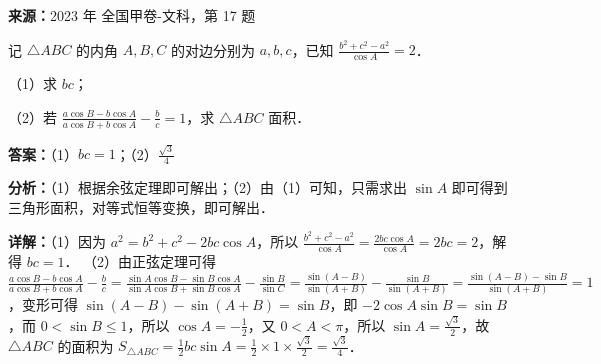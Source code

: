 \begin{question}
\textbf{来源：}2023 年 全国甲卷-文科，第 17 题\par
记 $\triangle ABC$ 的内角 $A,B,C$ 的对边分别为 $a,b,c$，已知 $\frac{b^2+c^2-a^2}{\cos A}=2$．

（1）求 $bc$；

（2）若 $\frac{a\cos B-b\cos A}{a\cos B+b\cos A}-\frac{b}{c}=1$，求 $\triangle ABC$ 面积．
\begin{solution}
\textbf{答案：}（1）$bc=1$；（2）$\frac{\sqrt{3}}{4}$

\textbf{分析：}（1）根据余弦定理即可解出；（2）由（1）可知，只需求出 $\sin A$ 即可得到三角形面积，对等式恒等变换，即可解出．

\textbf{详解：}（1）因为 $a^2=b^2+c^2-2bc\cos A$，所以 $\frac{b^2+c^2-a^2}{\cos A}=\frac{2bc\cos A}{\cos A}=2bc=2$，解得 $bc=1$．
（2）由正弦定理可得 $\frac{a\cos B-b\cos A}{a\cos B+b\cos A}-\frac{b}{c}=\frac{\sin A\cos B-\sin B\cos A}{\sin A\cos B+\sin B\cos A}-\frac{\sin B}{\sin C}=\frac{\sin(A-B)}{\sin(A+B)}-\frac{\sin B}{\sin(A+B)}=\frac{\sin(A-B)-\sin B}{\sin(A+B)}=1$，变形可得 $\sin(A-B)-\sin(A+B)=\sin B$，即 $-2\cos A\sin B=\sin B$，而 $0<\sin B\le1$，所以 $\cos A=-\frac{1}{2}$，又 $0<A<\pi$，所以 $\sin A=\frac{\sqrt{3}}{2}$，故 $\triangle ABC$ 的面积为 $S_{\triangle ABC}=\frac{1}{2}bc\sin A=\frac{1}{2}\times1\times\frac{\sqrt{3}}{2}=\frac{\sqrt{3}}{4}$．
\end{solution}
\end{question}

